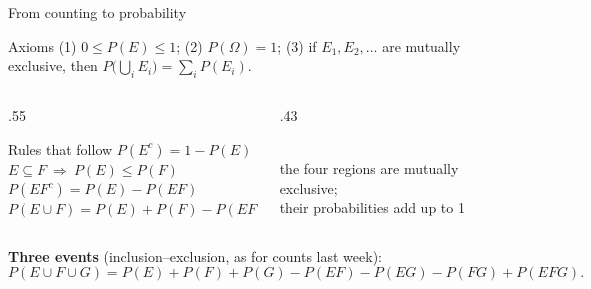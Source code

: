 \documentclass[aspectratio=169,11pt,usepdftitle=false]{beamer}
\newcommand{\Om}{\Omega}
\begin{document}




\begin{frame}{From counting to probability}
  \small
  \begin{block}{Axioms}
    (1) $0\le P(E)\le1$; \quad (2) $P(\Om)=1$; \quad (3) if $E_1,E_2,\dots$
    are mutually exclusive, then $P\big(\bigcup_i E_i\big)=\sum_i P(E_i)$.
  \end{block}
  \begin{columns}[T]
    \begin{column}{.55\textwidth}
      \begin{block}{Rules that follow}
        $P(E^c)=1-P(E)$\\[2pt]
        $E\subseteq F\ \Rightarrow\ P(E)\le P(F)$\\[2pt]
        $P(EF^c)=P(E)-P(EF)$\\[2pt]
        $P(E\cup F)=P(E)+P(F)-P(EF)$
      \end{block}
    \end{column}
    \begin{column}{.43\textwidth}
      \centering
      \\[1mm]
      \footnotesize the four regions are mutually exclusive;\\
      their probabilities add up to 1
    \end{column}
  \end{columns}
  \vspace{1mm}
  \textbf{Three events} (inclusion--exclusion, as for counts last week):
  \[ P(E\cup F\cup G)=P(E)+P(F)+P(G)-P(EF)-P(EG)-P(FG)+P(EFG). \]
\end{frame}

\end{document}

